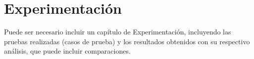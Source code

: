 \graphicspath{{chapters/5_experimentos/figures/}}

\chapter{Experimentación}\label{chap:experiments}
Puede ser necesario incluir un capítulo de Experimentación, incluyendo las pruebas realizadas (casos de prueba) y los resultados obtenidos con su respectivo análisis, que puede incluir comparaciones.

